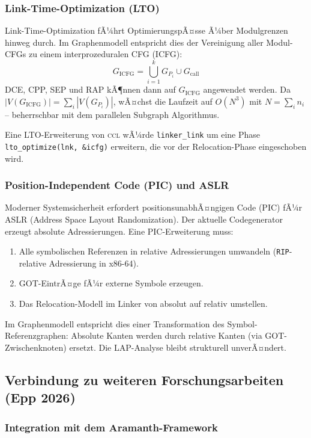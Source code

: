 ﻿\documentclass[a4paper,12pt]{article}
\theoremstyle{definition}
\begin{document}
\subsubsection{Link-Time-Optimization (LTO)}

Link-Time-Optimization fÃ¼hrt OptimierungspÃ¤sse Ã¼ber Modulgrenzen hinweg
durch. Im Graphenmodell entspricht dies der Vereinigung aller
Modul-CFGs zu einem interprozeduralen CFG (ICFG):
\[
G_{\mathrm{ICFG}} = \bigcup_{i=1}^{k} G_{P_i} \cup G_{\mathrm{call}}
\]
DCE, CPP, SEP und RAP kÃ¶nnen dann auf $G_{\mathrm{ICFG}}$ angewendet
werden. Da $|V(G_{\mathrm{ICFG}})| = \sum_i |V(G_{P_i})|$, wÃ¤chst die
Laufzeit auf $O(N^3)$ mit $N = \sum_i n_i$ -- beherrschbar mit dem
parallelen Subgraph Algorithmus.

Eine LTO-Erweiterung von \textsc{ccl} wÃ¼rde
\texttt{linker\_link} um eine Phase
\texttt{lto\_optimize(lnk, \&icfg)} erweitern, die vor der
Relocation-Phase eingeschoben wird.

\subsubsection{Position-Independent Code (PIC) und ASLR}

Moderner Systemsicherheit erfordert positionsunabhÃ¤ngigen Code (PIC)
fÃ¼r ASLR (Address Space Layout Randomization). Der aktuelle Codegenerator
erzeugt absolute Adressierungen. Eine PIC-Erweiterung muss:
\begin{enumerate}
	\item Alle symbolischen Referenzen in relative Adressierungen
	umwandeln (\texttt{RIP}-relative Adressierung in x86-64).
	\item GOT-EintrÃ¤ge fÃ¼r externe Symbole erzeugen.
	\item Das Relocation-Modell im Linker von absolut auf relativ
	umstellen.
\end{enumerate}
Im Graphenmodell entspricht dies einer Transformation des
Symbol-Referenzgraphen: Absolute Kanten werden durch relative Kanten
(via GOT-Zwischenknoten) ersetzt. Die LAP-Analyse bleibt strukturell
unverÃ¤ndert.

\subsection{Verbindung zu weiteren Forschungsarbeiten (Epp 2026)}
\label{sec:ausblick-epp}

\subsubsection{Integration mit dem Aramanth-Framework}
\end{document}
